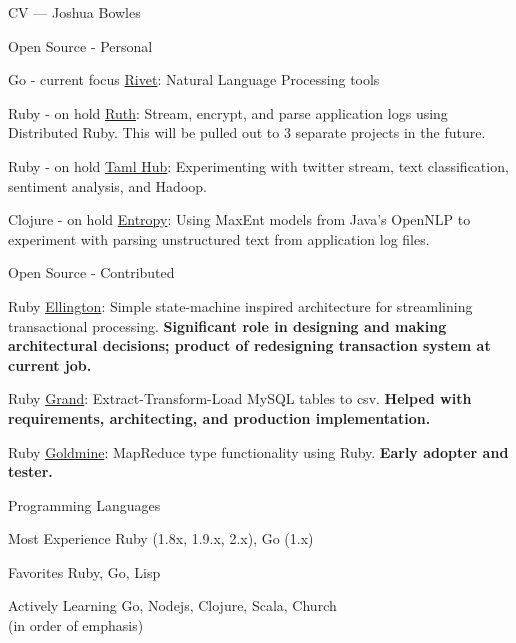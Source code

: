 \begin{cv}{CV --- Joshua Bowles}
\begin{cvlist}{Open Source - Personal}
\item[Go - current focus]{\href{http://jbowles.github.io/rivet/}{Rivet}: Natural Language Processing tools}
\item[Ruby - on hold]{\href{http://jbowles.github.com/ruth/}{Ruth}: Stream, encrypt, and parse application logs using Distributed Ruby. This will be pulled out to 3 separate projects in the future.}
\item[Ruby -  on hold]{\href{https://github.com/jbowles/taml_hub}{Taml Hub}: Experimenting with twitter stream, text classification, sentiment analysis, and Hadoop.}
\item[Clojure - on hold]{\href{https://github.com/jbowles/entropy}{Entropy}: Using MaxEnt models from Java's OpenNLP to experiment with parsing unstructured text from application log files}.
\end{cvlist}

\begin{cvlist}{Open Source - Contributed}
\item[Ruby]{\href{https://github.com/hopsoft/ellington}{Ellington}: Simple state-machine inspired architecture for streamlining transactional processing. {\bf Significant role in designing and making architectural decisions; product of redesigning transaction system at current job.}}
\item[Ruby]{\href{https://github.com/hopsoft/grand}{Grand}: Extract-Transform-Load MySQL tables to csv. {\bf Helped with requirements, architecting, and production implementation.}}
\item[Ruby]{\href{http://hopsoft.github.com/goldmine/}{Goldmine}: MapReduce type functionality using Ruby. {\bf Early adopter and tester.}}
\end{cvlist}


\begin{cvlist}{Programming Languages}
\item[Most Experience] Ruby (1.8x, 1.9.x, 2.x), Go (1.x)
\item[Favorites] Ruby, Go, Lisp
\item[Actively Learning] Go, Nodejs, Clojure, Scala, Church\\ \tiny{(in order of emphasis)}
\end{cvlist}


\end{cv}

